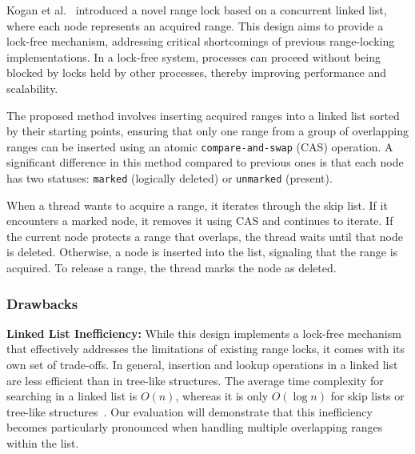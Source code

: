Kogan et al.~\parencite{kogan2020scalable} introduced a novel range lock based on a concurrent linked list, where each node represents an acquired range. This design aims to provide a lock-free mechanism, addressing critical shortcomings of previous range-locking implementations. In a lock-free system, processes can proceed without being blocked by locks held by other processes, thereby improving performance and scalability.

The proposed method involves inserting acquired ranges into a linked list sorted by their starting points, ensuring that only one range from a group of overlapping ranges can be inserted using an atomic \texttt{compare-and-swap} (CAS) operation. A significant difference in this method compared to previous ones is that each node has two statuses: \texttt{marked} (logically deleted) or \texttt{unmarked} (present).

When a thread wants to acquire a range, it iterates through the skip list. If it encounters a marked node, it removes it using CAS and continues to iterate. If the current node protects a range that overlaps, the thread waits until that node is deleted. Otherwise, a node is inserted into the list, signaling that the range is acquired. To release a range, the thread marks the node as deleted.

\subsubsection*{Drawbacks}

\textbf{Linked List Inefficiency:} While this design implements a lock-free mechanism that effectively addresses the limitations of existing range locks, it comes with its own set of trade-offs. In general, insertion and lookup operations in a linked list are less efficient than in tree-like structures. The average time complexity for searching in a linked list is \( O(n) \), whereas it is only \( O(\log n) \) for skip lists or tree-like structures~\parencite{fomitchev2004lock}. Our evaluation will demonstrate that this inefficiency becomes particularly pronounced when handling multiple overlapping ranges within the list.